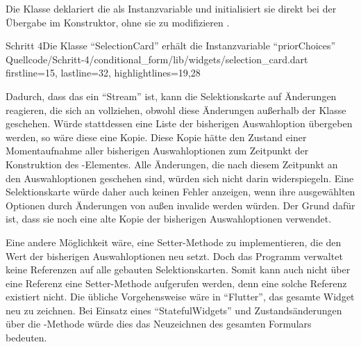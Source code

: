 Die Klasse  deklariert die  als Instanzvariable 
und initialisiert sie direkt bei der Übergabe im Konstruktor,
ohne sie zu modifizieren .

\begin{alexlisting}{Schritt 4}{Die Klasse \enquote{SelectionCard} erhält die Instanzvariable \enquote{priorChoices}}
  {Quellcode/Schritt-4/conditional_form/lib/widgets/selection_card.dart}
  {firstline=15, lastline=32, highlightlines={19,28}}
  \label{lst:Schritt4SelectionCardPriorChoices}
\end{alexlisting} 


Dadurch, dass das  ein \enquote{Stream} ist,
kann die Selektionskarte auf Änderungen reagieren,
die sich an  vollziehen,
obwohl diese Änderungen außerhalb der Klasse geschehen.
Würde stattdessen eine Liste der bisherigen Auswahloption übergeben werden,
so wäre diese eine Kopie.
Diese Kopie hätte den Zustand einer Momentaufnahme aller bisherigen Auswahloptionen zum Zeitpunkt der Konstruktion des -Elementes.
Alle Änderungen,
die nach diesem Zeitpunkt an den Auswahloptionen geschehen sind,
würden sich nicht darin widerspiegeln.
Eine Selektionskarte würde daher auch keinen Fehler anzeigen,
wenn ihre ausgewählten Optionen durch Änderungen von außen invalide werden würden.
Der Grund dafür ist,
dass sie noch eine alte Kopie der bisherigen Auswahloptionen verwendet.

Eine andere Möglichkeit wäre,
eine Setter-Methode zu implementieren,
die den Wert der bisherigen Auswahloptionen neu setzt.
Doch das Programm verwaltet keine Referenzen auf alle gebauten Selektionskarten.
Somit kann auch nicht über eine Referenz eine Setter-Methode aufgerufen werden,
denn eine solche Referenz existiert nicht. 
Die übliche Vorgehensweise wäre in \enquote{Flutter},
das gesamte Widget neu zu zeichnen.
Bei Einsatz eines \enquote{StatefulWidgets} und Zustandsänderungen über die -Methode würde dies das Neuzeichnen des gesamten Formulars bedeuten.

